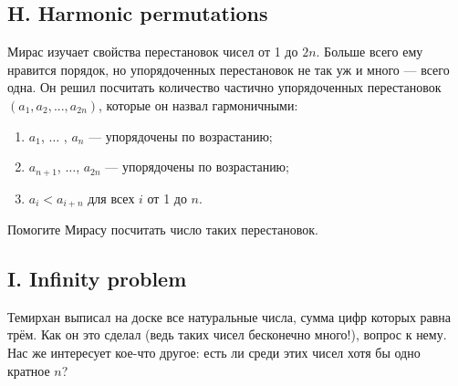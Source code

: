 \subsection*{H. Harmonic permutations}

Мирас изучает свойства перестановок чисел от 1 до $2n$. Больше всего ему нравится порядок, но упорядоченных перестановок не так уж и много --- всего одна. Он решил посчитать количество частично упорядоченных перестановок $(a_1, a_2, ..., a_{2n})$, которые он назвал гармоничными:

\begin{enumerate}
\item $a_1$, $\dots$ , $a_n$ --- упорядочены по возрастанию;
\item $a_{n+1}$, $\dots$, $a_{2n}$ --- упорядочены по возрастанию;
\item $a_i < a_{i+n}$ для всех $i$ от 1 до $n$.
\end{enumerate}

Помогите Мирасу посчитать число таких перестановок.







\subsection*{I. Infinity problem}

Темирхан выписал на доске все натуральные числа, сумма цифр которых равна трём. Как он это сделал (ведь таких чисел бесконечно много!), вопрос к нему. Нас же интересует кое-что другое: есть ли среди этих чисел хотя бы одно кратное $n$?








